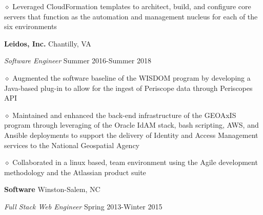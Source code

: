 \documentclass[executivepaper]{extarticle}
\begin{document}
\begin{center}
{\begin{minipage}{7.0in}
\vspace{0.25mm}

{\noindent $\diamond$ {\fontsize{12}{8}\selectfont Leveraged CloudFormation templates to architect, build, and configure core servers that function as the automation and management nucleus for each of the six environments}}

\vspace{2mm}

{\noindent \textbf{\fontsize{12}{8}\selectfont Leidos, Inc.}} {\hfill \fontsize{10}{8}\selectfont Chantilly, VA}

\vspace{0.25mm}

{\noindent \textit{\fontsize{12}{8}\selectfont Software Engineer}} {\hfill \fontsize{10}{8}\selectfont Summer 2016-Summer 2018}

\vspace{0.25mm}

{\noindent $\diamond$ {\fontsize{12}{8}\selectfont Augmented the software baseline of the WISDOM program by developing a Java-based plug-in to allow for the ingest of Periscope data through Periscope\textsc{}s API}}

\vspace{0.25mm}

{\noindent $\diamond$ {\fontsize{12}{8}\selectfont Maintained and enhanced the back-end infrastructure of the GEOAxIS program through leveraging of the Oracle IdAM stack, bash scripting, AWS, and Ansible deployments to support the delivery of Identity and Access Management services to the National Geospatial Agency}}

\vspace{0.25mm}

{\noindent $\diamond$ {\fontsize{12}{8}\selectfont Collaborated in a linux based, team environment using the Agile development methodology and the Atlassian product suite}}

\vspace{2mm}

{\noindent \textbf{\fontsize{12}{8} Software}} {\hfill \fontsize{10}{8}\selectfont Winston-Salem, NC}

\vspace{0.25mm}

{\noindent \textit{\fontsize{12}{8}\selectfont Full Stack Web Engineer}} {\hfill \fontsize{10}{8}\selectfont Spring 2013-Winter 2015}

\vspace{0.25mm}


\end{minipage}}
\end{center}
\end{document}
